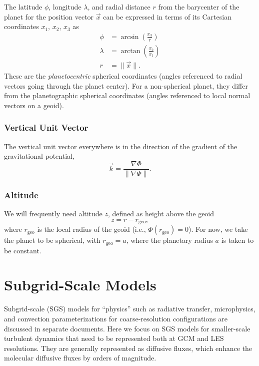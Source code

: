 \documentclass{report}
\begin{document}
The latitude $\phi$, longitude $\lambda$, and radial distance $r$ from the barycenter of the planet for the position vector $\vec{x}$ can be expressed in terms of its Cartesian coordinates $x_1$, $x_2$, $x_3$ as
\begin{subequations}
\begin{align}
\phi     &= \arcsin\left(\frac{x_3}{r}\right) \\
\lambda  &= \arctan\left(\frac{x_2}{x_1}\right) \\
r        &= \|\vec{x}\|.
\end{align}
\end{subequations}
These are the \emph{planetocentric} spherical coordinates (angles referenced to radial vectors going through the planet center). For a non-spherical planet, they differ from the planetographic spherical coordinates (angles referenced to local normal vectors on a geoid).

\subsection{Vertical Unit Vector}

The vertical unit vector everywhere is in the direction of the gradient of the gravitational potential,
\begin{equation}\label{e:vert_unit_vector}
\vec{k} = \frac{\nabla \Phi}{\|\nabla\Phi\|}.
\end{equation}

\subsection{Altitude}

We will frequently need altitude $z$, defined as height above the geoid 
\begin{equation}
z=r-r_{\mathrm{geo}}, 
\end{equation}
where  $r_{\mathrm{geo}}$ is the local radius of the geoid (i.e., $\Phi(r_{\mathrm{geo}})=0$). For now, we take the planet to be spherical, with $r_{\mathrm{geo}} = a$, where the planetary radius $a$ is taken to be constant.

\chapter{Subgrid-Scale Models}
\label{sec:sgs_models}

Subgrid-scale (SGS) models for ``physics'' such as radiative transfer, microphysics, and convection parameterizations for coarse-resolution configurations are discussed in  separate documents. Here we focus on SGS models for smaller-scale turbulent dynamics that need to be represented both at GCM and LES resolutions. They are generally represented as diffusive fluxes, which enhance the molecular diffusive fluxes by orders of magnitude.
\end{document}
